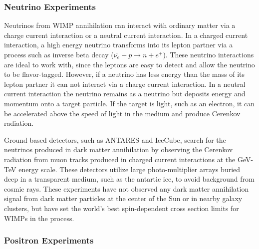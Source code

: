 \documentclass[a4paper,12pt]{article}
\begin{document}
\subsubsection{Neutrino Experiments}

Neutrinos from WIMP annihilation can interact with ordinary matter via a charge current interaction or a neutral current interaction.  In a charged current interaction, a high energy neutrino transforms into its lepton partner via a process such as inverse beta decay ($\bar{\nu_e} + p \rightarrow n + e^+ $).  These neutrino interactions are ideal to work with, since the leptons are easy to detect and allow the neutrino to be flavor-tagged.  However, if a neutrino has less energy than the mass of its lepton partner it can not interact via a charge current interaction.  In a neutral current interaction the neutrino remains as a neutrino but deposits energy and momentum onto a target particle.  If the target is light, such as an electron, it can be accelerated above the speed of light in the medium and produce Cerenkov radiation.  

Ground based detectors, such as ANTARES and IceCube, search for the neutrinos produced in dark matter annihilation by observing the Cerenkov radiation from muon tracks produced in charged current interactions at the GeV-TeV energy scale.  These detectors utilize large photo-multiplier arrays buried deep in a transparent medium, such as the antartic ice, to avoid background from cosmic rays.  These experiments have not observed any dark matter annihilation signal from dark matter particles at the center of the Sun or in nearby galaxy clusters, but have set the world's best spin-dependent cross section limits for WIMPs in the process. \cite{IceCube, IceCube2}

\subsubsection{Positron Experiments}
\end{document}
